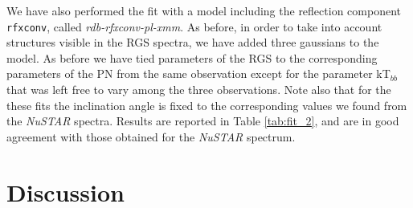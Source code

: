 \documentclass{aa}
\begin{document}
We have also performed the fit with a model including the reflection component
\texttt{rfxconv}, called \emph{rdb-rfxconv-pl-xmm}.
As before, in order to take into account structures visible in the RGS spectra, we 
have added three gaussians to the model. As before we have tied parameters of the 
RGS to the corresponding parameters of the PN from the same observation except
for the parameter kT$_{bb}$ that was left free to vary among the three observations. 
Note also that for the these fits the inclination angle is fixed to the corresponding
values we found from the \emph{NuSTAR} spectra.
Results are reported in Table \ref{tab:fit_2}, and are in good agreement with those
obtained for the \emph{NuSTAR} spectrum.





\section{Discussion }
\label{sec:disc}
\end{document}
